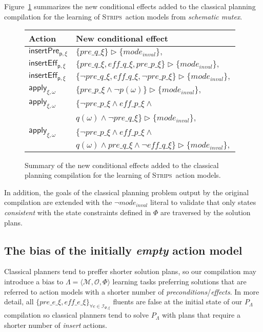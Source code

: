 \documentclass{article}
\newcommand{\tup}[1]{{\langle #1 \rangle}}
\newcommand{\strips}{\textsc{Strips}}
\begin{document}
Figure~\ref{fig:ceffects} summarizes the new conditional effects added to the classical planning compilation for the learning of \strips\ action models from {\em schematic mutex}.
\begin{figure}
\begin{tabular}{ll}
{\bf Action} & {\bf New conditional effect}\\\hline
$\mathsf{insertPre_{p,\xi}}$ & $\{pre\_q\_\xi\}\rhd\{mode_{inval}\},$\\
$\mathsf{insertEff_{p,\xi}}$ & $\{pre\_q\_\xi,eff\_q\_\xi,pre\_p\_\xi\}\rhd\{mode_{inval}\},$\\
$\mathsf{insertEff_{p,\xi}}$ & $\{\neg pre\_q\_\xi,eff\_q\_\xi,\neg pre\_p\_\xi\}\rhd\{mode_{inval}\},$\\
$\mathsf{apply_{\xi,\omega}}$ & $\{pre\_p\_\xi \wedge \neg p(\omega)\}\rhd\{mode_{inval}\},$\\
$\mathsf{apply_{\xi,\omega}}$ & $\{\neg pre\_p\_\xi \wedge eff\_p\_\xi \wedge $\\\
& $q(\omega)\wedge \neg pre\_q\_\xi\}\rhd\{mode_{inval}\},$\\
$\mathsf{apply_{\xi,\omega}}$ & $\{\neg pre\_p\_\xi \wedge eff\_p\_\xi \wedge $\\
&$q(\omega)\wedge pre\_q\_\xi \wedge \neg eff\_q\_\xi\}\rhd\{mode_{inval}\},$
\end{tabular}
	\caption{\small Summary of the new conditional effects added to the classical planning compilation for the learning of \strips\ action models.}
	\label{fig:ceffects}
\end{figure}

In addition, the goals of the classical planning problem output by the original compilation are extended with the $\neg mode_{inval}$ literal to validate that only states {\em consistent} with the state constraints defined in $\Phi$ are traversed by the solution plans.



\subsection{The bias of the initially {\em empty} action model}
Classical planners tend to preffer shorter solution plans, so our compilation may introduce a bias to $\Lambda=\tup{\mathcal{M},{\mathcal O},\Phi}$ learning tasks preferring solutions that are referred to action models with a shorter number of {\em preconditions}/{\em effects}. In more detail, all $\{pre\_e\_\xi, eff\_e\_\xi\}_{\forall e\in{\mathcal I}_{\Psi,\xi}}$ fluents are false at the initial state of our $P_\Lambda$ compilation so classical planners tend to solve $P_\Lambda$ with plans that require a shorter number of {\em insert} actions.
\end{document}
